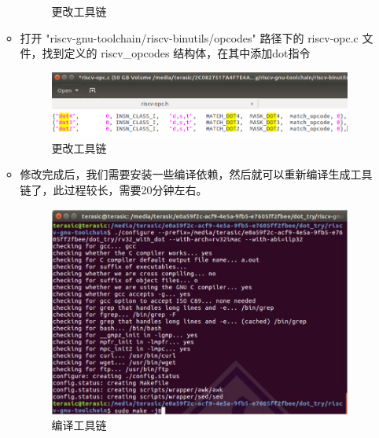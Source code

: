 \documentclass[a4paper, 14pt, oneside]{book} %
\numberwithin{equation}{subsection}
\begin{document}
\begin{enumerate}
\begin{itemize}
\begin{figure}[H]
					\caption{更改工具链}
				\end{figure}
			\item 打开 "riscv-gnu-toolchain/riscv-binutils/opcodes" 路径下的 riscv-opc.c 文件，找到定义的 riscv\_opcodes 结构体，在其中添加dot指令
				\begin{figure}[H]
					\centering  
					\includegraphics[scale=0.5]{img/5.png} 
					\caption{更改工具链}
				\end{figure}
			\item 修改完成后，我们需要安装一些编译依赖，然后就可以重新编译生成工具链了，此过程较长，需要20分钟左右。
				\begin{figure}[H]
					\centering  
					\includegraphics[scale=0.8]{img/COMPILE.JPG} 
					\caption{编译工具链}
				\end{figure}
		\end{itemize}
		

\end{enumerate}
\end{document}
